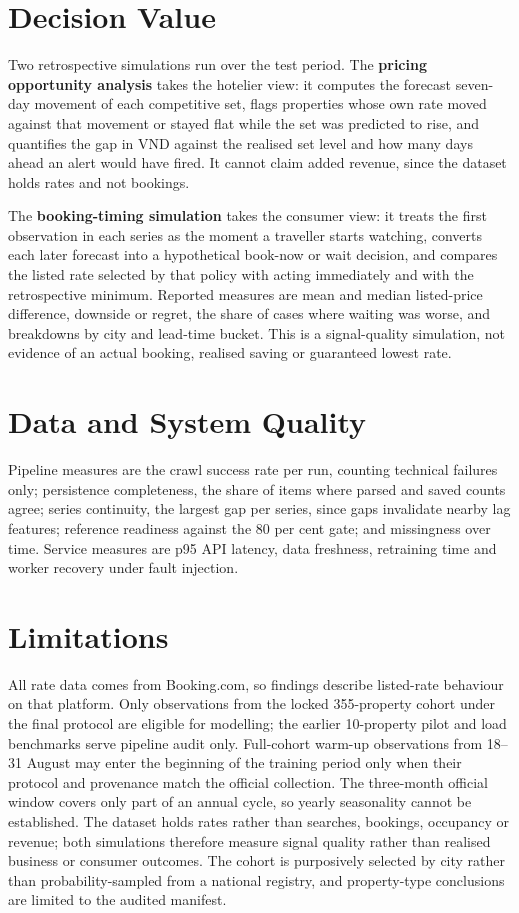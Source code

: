 \section{Decision Value}

Two retrospective simulations run over the test period. The \textbf{pricing opportunity analysis} takes the hotelier view: it computes the forecast seven-day movement of each competitive set, flags properties whose own rate moved against that movement or stayed flat while the set was predicted to rise, and quantifies the gap in VND against the realised set level and how many days ahead an alert would have fired. It cannot claim added revenue, since the dataset holds rates and not bookings.

The \textbf{booking-timing simulation} takes the consumer view: it treats the first observation in each series as the moment a traveller starts watching, converts each later forecast into a hypothetical book-now or wait decision, and compares the listed rate selected by that policy with acting immediately and with the retrospective minimum. Reported measures are mean and median listed-price difference, downside or regret, the share of cases where waiting was worse, and breakdowns by city and lead-time bucket. This is a signal-quality simulation, not evidence of an actual booking, realised saving or guaranteed lowest rate.

\section{Data and System Quality}

Pipeline measures are the crawl success rate per run, counting technical failures only; persistence completeness, the share of items where parsed and saved counts agree; series continuity, the largest gap per series, since gaps invalidate nearby lag features; reference readiness against the 80 per cent gate; and missingness over time. Service measures are p95 API latency, data freshness, retraining time and worker recovery under fault injection.

\section{Limitations}

All rate data comes from Booking.com, so findings describe listed-rate behaviour on that platform. Only observations from the locked 355-property cohort under the final protocol are eligible for modelling; the earlier 10-property pilot and load benchmarks serve pipeline audit only. Full-cohort warm-up observations from 18--31 August may enter the beginning of the training period only when their protocol and provenance match the official collection. The three-month official window covers only part of an annual cycle, so yearly seasonality cannot be established. The dataset holds rates rather than searches, bookings, occupancy or revenue; both simulations therefore measure signal quality rather than realised business or consumer outcomes. The cohort is purposively selected by city rather than probability-sampled from a national registry, and property-type conclusions are limited to the audited manifest.

\clearpage
